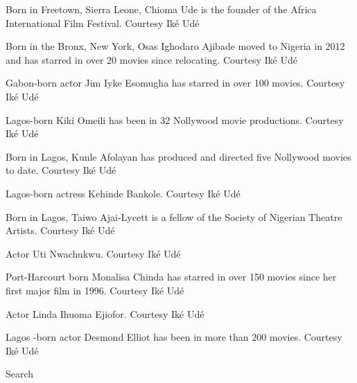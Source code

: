 Born in Freetown, Sierra Leone, Chioma Ude is the founder of the Africa
International Film Festival. Courtesy Iké Udé

Born in the Bronx, New York, Osas Ighodaro Ajibade moved to Nigeria in
2012 and has starred in over 20 movies since relocating. Courtesy Iké
Udé

Gabon-born actor Jim Iyke Esomugha has starred in over 100 movies.
Courtesy Iké Udé

Lagos-born Kiki Omeili has been in 32 Nollywood movie productions.
Courtesy Iké Udé

Born in Lagos, Kunle Afolayan has produced and directed five Nollywood
movies to date. Courtesy Iké Udé

Lagos-born actress Kehinde Bankole. Courtesy Iké Udé

Born in Lagos, Taiwo Ajai-Lycett is a fellow of the Society of Nigerian
Theatre Artists. Courtesy Iké Udé

Actor Uti Nwachukwu. Courtesy Iké Udé

Port-Harcourt born Monalisa Chinda has starred in over 150 movies since
her first major film in 1996. Courtesy Iké Udé

Actor Linda Ihuoma Ejiofor. Courtesy Iké Udé

Lagos -born actor Desmond Elliot has been in more than 200 movies.
Courtesy Iké Udé

Search

